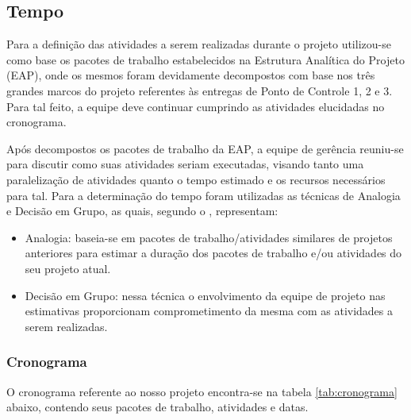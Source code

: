 \subsection{Tempo}


Para a definição das atividades a serem realizadas durante o projeto utilizou-se como base os pacotes de trabalho estabelecidos na Estrutura Analítica do Projeto (EAP), onde os mesmos foram devidamente decompostos com base nos três grandes marcos do projeto referentes às entregas de Ponto de Controle 1, 2 e 3. Para tal feito, a equipe deve continuar cumprindo as atividades elucidadas no cronograma.

Após decompostos os pacotes de trabalho da EAP, a equipe de gerência reuniu-se para discutir como suas atividades seriam executadas, visando tanto uma paralelização de atividades quanto o tempo estimado e os recursos necessários para tal. Para a determinação do tempo foram utilizadas as técnicas de Analogia e Decisão em Grupo, as quais, segundo o \cite{PMBK}, representam:

\begin{itemize}

\item Analogia: baseia-se em pacotes de trabalho/atividades similares de projetos anteriores para estimar a duração dos pacotes de trabalho e/ou atividades do seu projeto
atual.

\item Decisão em Grupo: nessa técnica o envolvimento da equipe de projeto nas estimativas proporcionam comprometimento da mesma com as atividades a serem realizadas.

\end{itemize}

\subsubsection{Cronograma}
O cronograma referente ao nosso projeto encontra-se na tabela \ref{tab:cronograma} abaixo, contendo seus pacotes de trabalho, atividades e datas. 

